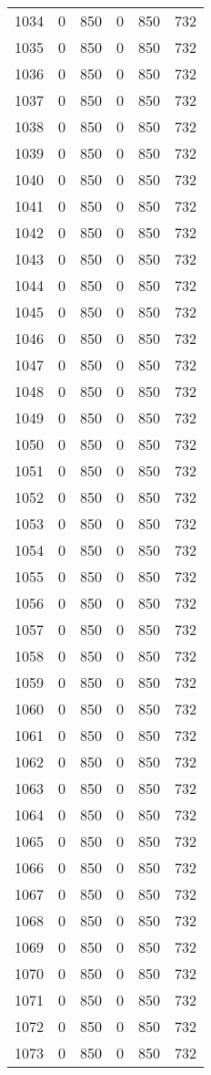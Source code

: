 \documentclass[a4paper]{ctexart}
\begin{document}
\begin{longtable}{p{1cm}|p{2cm}|p{2cm}|p{2cm}|P{2cm}|p{2cm}}
		1034&0&850&0&850&732\\
		1035&0&850&0&850&732\\
		1036&0&850&0&850&732\\
		1037&0&850&0&850&732\\
		1038&0&850&0&850&732\\
		1039&0&850&0&850&732\\
		1040&0&850&0&850&732\\
		1041&0&850&0&850&732\\
		1042&0&850&0&850&732\\
		1043&0&850&0&850&732\\
		1044&0&850&0&850&732\\
		1045&0&850&0&850&732\\
		1046&0&850&0&850&732\\
		1047&0&850&0&850&732\\
		1048&0&850&0&850&732\\
		1049&0&850&0&850&732\\
		1050&0&850&0&850&732\\
		1051&0&850&0&850&732\\
		1052&0&850&0&850&732\\
		1053&0&850&0&850&732\\
		1054&0&850&0&850&732\\
		1055&0&850&0&850&732\\
		1056&0&850&0&850&732\\
		1057&0&850&0&850&732\\
		1058&0&850&0&850&732\\
		1059&0&850&0&850&732\\
		1060&0&850&0&850&732\\
		1061&0&850&0&850&732\\
		1062&0&850&0&850&732\\
		1063&0&850&0&850&732\\
		1064&0&850&0&850&732\\
		1065&0&850&0&850&732\\
		1066&0&850&0&850&732\\
		1067&0&850&0&850&732\\
		1068&0&850&0&850&732\\
		1069&0&850&0&850&732\\
		1070&0&850&0&850&732\\
		1071&0&850&0&850&732\\
		1072&0&850&0&850&732\\
		1073&0&850&0&850&732\\

\end{longtable}
\end{document}
